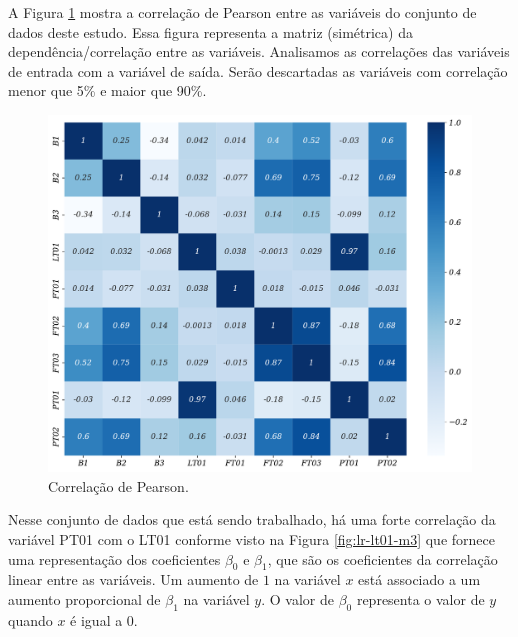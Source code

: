 %

A Figura \ref{fig:person} mostra a correlação de Pearson entre as variáveis do conjunto de dados deste estudo. Essa figura representa a matriz (simétrica) da dependência/correlação entre as variáveis. Analisamos as correlações das variáveis de entrada com a variável de saída. Serão descartadas as variáveis com correlação menor que 5\% e maior que 90\%.

\begin{figure}[!htb]
	\centering
	\caption{Correlação de Pearson.}
	\label{fig:person}	\includegraphics[width=0.7\linewidth]{Resultados/Figuras/person}
		
\end{figure}

Nesse conjunto de dados que está sendo trabalhado, há uma forte correlação da variável PT01 com o LT01 conforme visto na Figura \ref{fig:lr-lt01-m3} que fornece uma representação dos coeficientes $\beta_0$ e $\beta_1$, que são os coeficientes da correlação linear entre as variáveis. Um aumento de $1$ na variável $x$ está associado a um aumento proporcional de $\beta_1$ na variável $y$. O valor de $\beta_0$ representa o valor de $y$ quando $x$ é igual a $0$.

